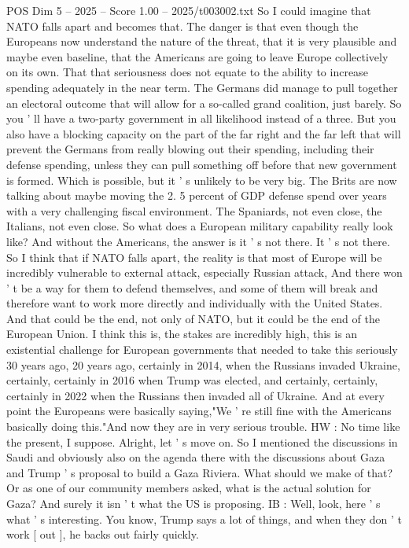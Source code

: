 \begin{textsample}{POS Dim 5 – 2025 – Score 1.00 – 2025/t003002.txt}
So I could imagine that NATO falls apart and becomes that.
The danger is that even though the Europeans now understand the nature of the threat, that it is very plausible and maybe even baseline, that the Americans are going to leave Europe collectively on its own.
That that seriousness does not equate to the ability to increase spending adequately in the near term.
The Germans did manage to pull together an electoral outcome that will allow for a so-called grand coalition, just barely.
So you ' ll have a two-party government in all likelihood instead of a three.
But you also have a blocking capacity on the part of the far right and the far left that will prevent the Germans from really blowing out their spending, including their defense spending, unless they can pull something off before that new government is formed.
Which is possible, but it ' s unlikely to be very big.
The Brits are now talking about maybe moving the 2. 5 percent of GDP defense spend over years with a very challenging fiscal environment.
The Spaniards, not even close, the Italians, not even close.
So what does a European military capability really look like?
And without the Americans, the answer is it ' s not there.
It ' s not there.
So I think that if NATO falls apart, the reality is that most of Europe will be incredibly vulnerable to external attack, especially Russian attack, And there won ' t be a way for them to defend themselves, and some of them will break and therefore want to work more directly and individually with the United States.
And that could be the end, not only of NATO, but it could be the end of the European Union.
I think this is, the stakes are incredibly high, this is an existential challenge for European governments that needed to take this seriously 30 years ago, 20 years ago, certainly in 2014, when the Russians invaded Ukraine, certainly, certainly in 2016 when Trump was elected, and certainly, certainly, certainly in 2022 when the Russians then invaded all of Ukraine.
And at every point the Europeans were basically saying,"We ' re still fine with the Americans basically doing this."And now they are in very serious trouble.
HW : No time like the present, I suppose.
Alright, let ' s move on.
So I mentioned the discussions in Saudi and obviously also on the agenda there with the discussions about Gaza and Trump ' s proposal to build a Gaza Riviera.
What should we make of that?
Or as one of our community members asked, what is the actual solution for Gaza?
And surely it isn ' t what the US is proposing.
IB : Well, look, here ' s what ' s interesting.
You know, Trump says a lot of things, and when they don ' t work [ out ], he backs out fairly quickly.

\end{textsample}
